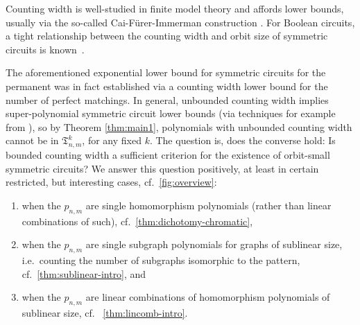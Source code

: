 \documentclass[10pt,a4paper]{article}
\theoremstyle{definition}
\theoremstyle{plain}
\theoremstyle{remark}
\begin{document}
Counting width is well-studied in finite model theory and affords lower bounds, usually via the so-called Cai-F\"urer-Immerman construction \cite{CFI}.
For Boolean
circuits, a tight relationship
between the counting width and orbit size of symmetric
circuits is known~\cite{anderson_symmetric_2017}.

The aforementioned exponential lower bound for symmetric circuits for the permanent was in fact established via a counting width lower bound for the number of perfect matchings. In general, unbounded counting width implies super-polynomial symmetric circuit lower bounds (via techniques for example from \cite{anderson_symmetric_2017,  dawar_symmetric_2025}), so by Theorem \ref{thm:main1}, polynomials with unbounded counting width cannot be in $\mathfrak{T}_{n,m}^k$, for any fixed $k$.
The question is, does the converse hold: Is bounded counting width a sufficient criterion for the existence of orbit-small symmetric circuits?
We answer this question positively, at least in certain restricted, but interesting cases, cf.\ \cref{fig:overview}:
\begin{enumerate}
	\item\label{it:hom} when the $p_{n,m}$ are single homomorphism polynomials (rather than linear combinations of such), cf.\ \cref{thm:dichotomy-chromatic},
	\item\label{it:sub} when the $p_{n,m}$ are single subgraph polynomials for graphs of sublinear size, i.e.\ counting  the number of subgraphs isomorphic to the pattern, cf.\ \cref{thm:sublinear-intro}, and
	\item\label{it:lincomb} when the $p_{n,m}$ are linear combinations of homomorphism polynomials of sublinear size, cf. \ \cref{thm:lincomb-intro}.
\end{enumerate}
\end{document}
